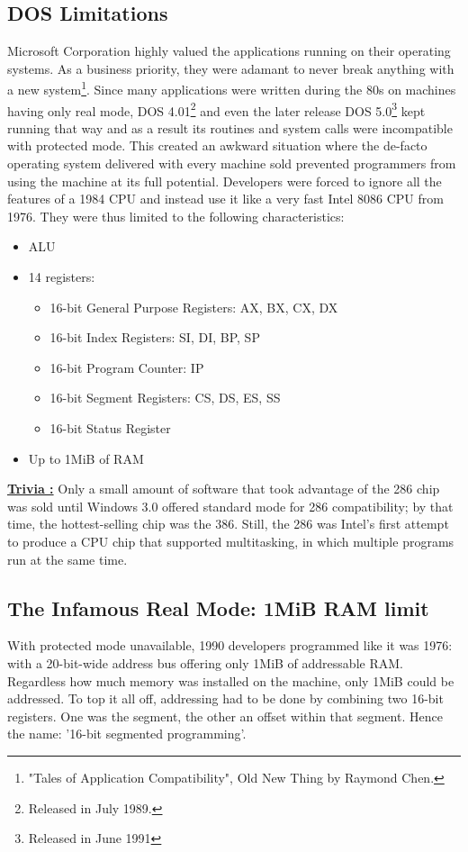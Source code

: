 \documentclass[book.tex]{subfiles}
\begin{document}
  \subsection{DOS Limitations}
  Microsoft Corporation highly valued the applications running on their operating systems. As a business priority, they were adamant to never break anything with a new system\footnote{"Tales of Application Compatibility", Old New Thing by Raymond Chen.}.  Since many applications were written during the 80s on machines having only real mode, DOS 4.01\footnote{Released in July 1989.} and even the later release DOS 5.0\footnote{Released in June 1991} kept running that way and as a result its routines and system calls were incompatible with protected mode. This created an awkward situation where the de-facto operating system delivered with every machine sold prevented programmers from using the machine at its full potential. Developers were forced to ignore all the features of a 1984 CPU and instead use it like a very fast Intel 8086 CPU from 1976. They were thus limited to the following characteristics:
\begin{itemize}
\item ALU
\item 14 registers:
\begin{itemize}
  \item 16-bit General Purpose Registers: AX, BX, CX, DX
  \item 16-bit Index Registers: SI, DI, BP, SP
  \item 16-bit Program Counter: IP
  \item 16-bit Segment Registers: CS, DS, ES, SS
  \item 16-bit Status Register
\end{itemize}
\item Up to 1MiB of RAM
\end{itemize}


\bigskip

\textbf{\underline{Trivia :}} Only a small amount of software that took advantage of the 286 chip was sold until Windows 3.0 offered standard mode for 286 compatibility; by that time, the hottest-selling chip was the 386. Still, the 286 was Intel's first attempt to produce a CPU chip that supported multitasking, in which multiple programs run at the same time.\\



  \subsection{The Infamous Real Mode: 1MiB RAM limit}
  With protected mode unavailable, 1990 developers programmed like it was 1976: with a 20-bit-wide address bus offering only 1MiB of addressable RAM. Regardless how much memory was installed on the machine, only 1MiB could be addressed. To top it all off, addressing had to be done by combining two 16-bit registers. One was the segment, the other an offset within that segment. Hence the name: '16-bit segmented programming'.
\end{document}
